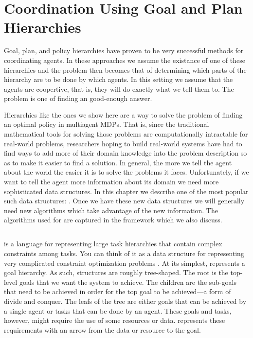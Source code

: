 \newcommand{\taems}{\acro{t\ae ms}}

\chapter{Coordination Using Goal and Plan Hierarchies}
\label{cha:hier-coord}


Goal, plan, and policy hierarchies have proven to be very successful
methods for coordinating agents. In these approaches we assume the
existance of one of these hierarchies and the problem then becomes
that of determining which parts of the hierarchy are to be done by
which agents. In this setting we assume that the agents are
coopertive, that is, they will do exactly what we tell them to. The
problem is one of finding an good-enough answer. 

Hierarchies like the ones we show here are a way to solve the problem
of finding an optimal policy in multiagent MDPs. That is, since the
traditional mathematical tools for solving those problems are
computationally intractable for real-world problems, researchers
hoping to build real-world systems have had to find ways to add more
of their domain knowledge into the problem description so as to make
it easier to find a solution. In general, the more we tell the agent
about the world the easier it is to solve the problems it faces.
Unfortunately, if we want to tell the agent more information about its
domain we need more sophisticated data structures. In this chapter we
describe one of the most popular such data structures: \taems{}. Once
we have these new data structures we will generally need new
algorithms which take advantage of the new information. The algorithms
used for \taems{} are captured in the  framework which we also
discuss.

\section{\taems{}}
\label{sec:taems}

\td{\taems{}} is a language for representing large task hierarchies
that contain complex constraints among tasks. You can think of it as a
data structure for representing very complicated constraint
optimization problems \cite{lesser04a}.  At its simplest, \taems{}
represents a goal hierarchy. As such, \taems{} structures are roughly
tree-shaped.  The root is the top-level goals that we want the system
to achieve.  The children are the sub-goals that need to be achieved
in order for the top goal to be achieved---a form of divide and
conquer. The leafs of the tree are either goals that can be achieved
by a single agent or tasks that can be done by an agent. These goals
and tasks, however, might require the use of some resources or data.
\taems{} represents these requirements with an arrow from the data or
resource to the goal.


